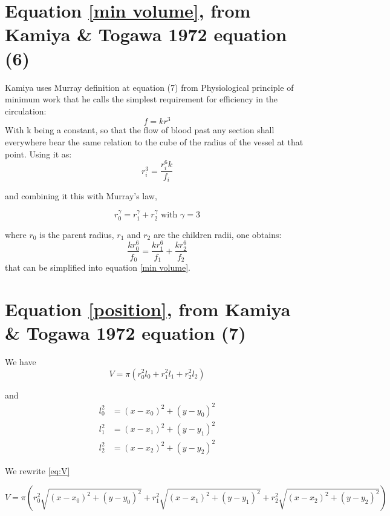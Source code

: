 \documentclass[a4paper, 11pt]{article} %
\newcommand{\sqlen}[1]{\ensuremath{(x - x_{#1})^2 + (y-y_{#1})^2}}
\begin{document}
\begin{appendices}
\section*{Equation \eqref{min volume}, from Kamiya \& Togawa 1972 equation  (6)}
Kamiya uses Murray definition at equation (7) from Physiological principle of minimum work \cite{murray1926physiological} that he calls the simplest requirement for efficiency in the circulation:
\begin{equation*}
f = k r^3
\end{equation*}
With k being a constant, so that the flow of blood past any section shall everywhere bear the same relation to the cube of the radius of the vessel at that point. Using it as:
\begin{equation*}
r_i^3 = \frac{r_i^6 k}{f_i}
\end{equation*}

and combining it this with Murray's law,

\begin{equation*}
r_0^\gamma = r_1^\gamma + r_2^\gamma \text{ with } \gamma = 3
\end{equation*}

 where $r_0$ is the parent radius, $r_1$ and $r_2$ are the children radii, one obtains:
\begin{equation*}
\frac{k r_0^6}{f_0} = \frac{k r_1^6}{f_1} + \frac{k r_2^6}{f_2}
\end{equation*}
that can be simplified into equation \eqref{min volume}.


\section*{Equation \eqref{position}, from Kamiya \& Togawa 1972 equation  (7) }
We have
\begin{equation}
\label{eq:V}
V = \pi(r_0^2 l_0 + r_1^2 l_1 + r_2^2 l_2)
\end{equation}

and
\begin{align*}
l_0^2 &= \sqlen{0} \\
l_1^2 &= \sqlen{1} \\
l_2^2 &= \sqlen{2} 
\end{align*}

We rewrite \eqref{eq:V}

\begin{equation*}
V = \pi(r_0^2 \sqrt{\sqlen{0}} + r_1^2 \sqrt{\sqlen{1}} + r_2^2 \sqrt{\sqlen{2}})
\end{equation*}


\end{appendices}
\end{document}
